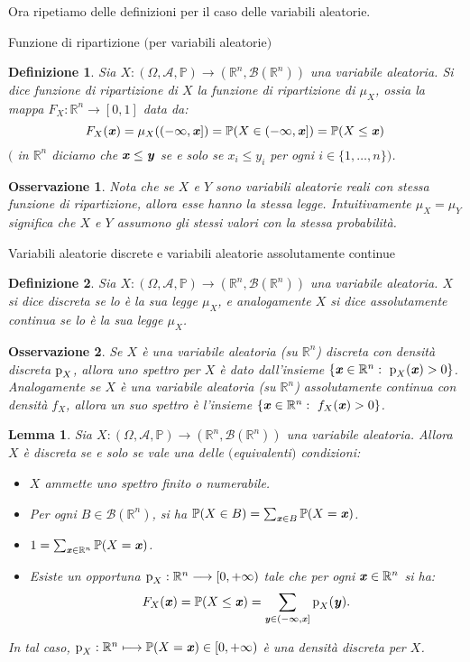 \documentclass[11pt]{book}
\theoremstyle{Definizione}
\newtheorem*{mydef}{Definizione}
\theoremstyle{TeoremaProposizioneLemmaCorollario}
\newtheorem{mylem}[myteo]{Lemma}
\theoremstyle{OsservazioneNota}
\newtheorem{myobs}{Osservazione}[section]
\newcommand{\R}{\mathbb{R}}
\newcommand{\gri}[1]{\textbf{\textit{{#1}}}}
\renewcommand{\P}{\mathbb{P}}
\newcommand{\p}{\textup{p}}
\begin{document}
Ora ripetiamo delle definizioni per il caso delle variabili aleatorie.
\begin{boxdef}{Funzione di ripartizione $($per variabili aleatorie$)$}
\begin{mydef}
Sia $X:(\Omega,\mathcal{A},\P) \longrightarrow (\R^n,\mathcal{B}(\R^n))$ una variabile aleatoria. Si dice funzione di ripartizione di $X$ la funzione di ripartizione di $\mu_X$, ossia la mappa $F_X:\R^n \longrightarrow [0,1]$ data da:
$$
F_X(\gri{x}) = \mu_X((-\infty,\gri{x}]) = \P(X\in (-\infty,\gri{x}]) = \P(X \leq \gri{x})
$$
$($ in $\R^n$ diciamo che $\gri{x}\leq \gri{y}$ se e solo se $x_i \leq y_i$ per ogni $i \in \{1,\dots,n\})$.
\end{mydef}
\end{boxdef}
\begin{myobs}
Nota che se $X$ e $Y$ sono variabili aleatorie reali con stessa funzione di ripartizione, allora esse hanno la stessa legge. Intuitivamente $\mu_X = \mu_Y$ significa che $X$ e $Y$ assumono gli stessi valori con la stessa probabilità.
\end{myobs}
\begin{boxdef}{Variabili aleatorie discrete e variabili aleatorie assolutamente continue}
\begin{mydef}
Sia $X:(\Omega,\mathcal{A},\P)\longrightarrow (\R^n,\mathcal{B}(\R^n))$ una variabile aleatoria. $X$ si dice discreta se lo è la sua legge $\mu_X$, e analogamente $X$ si dice assolutamente continua se lo è la sua legge $\mu_X$.
\end{mydef}
\end{boxdef}
\begin{myobs}
Se $X$ è una variabile aleatoria (su $\R^n$) discreta con densità discreta $\p_X$, allora uno spettro per $X$ è dato dall'insieme $\{\gri{x}\in \R^n:\ \p_X(\gri{x}) > 0\}$.\\
Analogamente se $X$ è una variabile aleatoria (su $\R^n$) assolutamente continua con densità $f_X$, allora un suo spettro è l'insieme $\{\gri{x}\in \R^n:\ f_X(\gri{x}) > 0\}$.
\end{myobs}
\begin{boxoss}
\begin{mylem}
Sia $X:(\Omega,\mathcal{A},\P)\longrightarrow (\R^n,\mathcal{B}(\R^n))$ una variabile aleatoria. Allora $X$ è discreta se e solo se vale una delle $($equivalenti$)$ condizioni:
\begin{itemize}
\item[$(i)$] $X$ ammette uno spettro finito o numerabile.
\item[$(ii)$] Per ogni $B\in \mathcal{B}(\R^n)$, si ha $\P(X\in B) = \sum_{\gri{x}\in B} \P(X = \gri{x})$.
\item[$(iii)$] $1 = \sum_{\gri{x}\in \R^n} \P(X = \gri{x})$.
\item[$(iv)$] Esiste un opportuna $\p_X:\R^n \longrightarrow [0,+\infty)$ tale che per ogni $\gri{x}\in \R^n$ si ha:
$$
F_X(\gri{x}) = \P(X \leq \gri{x}) = \sum_{\gri{y}\in (-\infty,\gri{x}]} \p_X(\gri{y}).
$$
\end{itemize}
In tal caso, $\p_X:\R^n \longmapsto \P(X = \gri{x}) \in [0,+\infty)$ è una densità discreta per $X$.
\end{mylem}
\end{boxoss}
\end{document}
